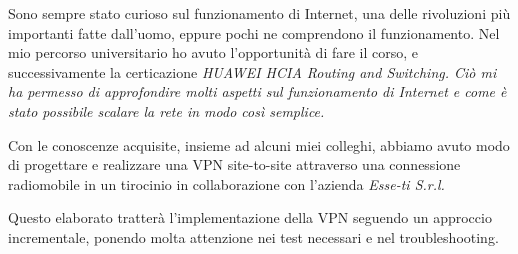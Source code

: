 \begin{flushleft}
\begin{comment}
Il lettore deve capire dal sommario l'ambito di applicazione del progetto svolto, la problematica esaminata, i metodi e gli algoritmi utilizzati per realizzare il progetto e risolvere gli eventuali problemi incontrati, i risultati ottenuti.

Dalla lettura del sommario il lettore deve comprendere se, per i suoi scopi, può essere utile proseguire o meno la lettura, ovvero se gli argomenti descritti rispondono alle sue necessità. Pensiamo, ad esempio, si pensi a un lettore che sia un laureando che si trova ad affrontare un progetto su temi o ambiti di applicazione collegati: vale la pena leggere questo elaborato?



\end{comment}


\begin{comment}

scaletta
prima parte
  sempre stato curioso su come funziona internet
  è un sistema complesso eppure lo usano tutti senza sapere cos'è
  fatto la certificazione HUAWEI per que
seconda parte
  in sto coso ci concentrimao sull'implementazione della vpn
  con vari test del funzionamento e bla bla


\end{comment}

Sono sempre stato curioso sul funzionamento di Internet, una delle rivoluzioni più importanti fatte dall'uomo, eppure pochi ne comprendono il funzionamento. Nel mio percorso universitario ho avuto l'opportunità di fare il corso, e successivamente la certicazione \it{HUAWEI HCIA Routing and Switching}. Ciò mi ha permesso di approfondire molti aspetti sul funzionamento di Internet e come è stato possibile scalare la rete in modo così semplice.

Con le conoscenze acquisite, insieme ad alcuni miei colleghi, abbiamo avuto modo di progettare e realizzare una VPN site-to-site attraverso una connessione radiomobile in un tirocinio in collaborazione con l'azienda \it{Esse-ti S.r.l.}

Questo elaborato tratterà l'implementazione della VPN seguendo un approccio incrementale, ponendo molta attenzione nei test necessari e nel troubleshooting.







\end{flushleft}



\vfill
\newpage